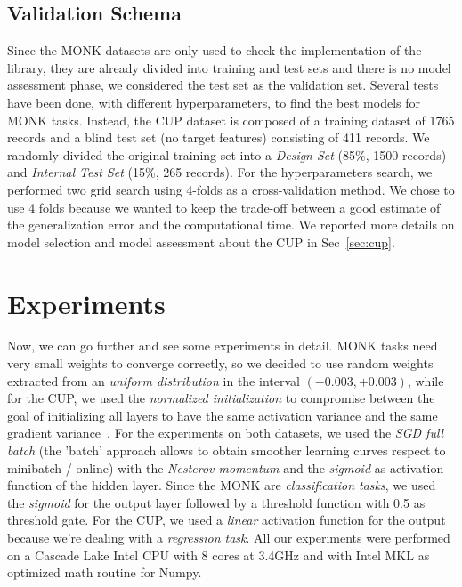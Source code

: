 \documentclass[11pt]{article}
\begin{document}
\subsection{Validation Schema}
\label{sec:validation_schema}
Since the MONK datasets are only used to check the implementation of the library, they are already divided into training and test sets and there is no model assessment phase, we considered the test set as the validation set. Several tests have been done, with different hyperparameters, to find the best models for MONK tasks. Instead, the CUP dataset is composed of a training dataset of 1765 records and a blind test set (no target features) consisting of 411 records. We randomly divided the original training set into a \textit{Design Set} (85\%, 1500 records) and \textit{Internal Test Set} (15\%, 265 records). For the hyperparameters search, we performed two grid search using 4-folds as a cross-validation method. We chose to use 4 folds because we wanted to keep the trade-off between a good estimate of the generalization error and the computational time. We reported more details on model selection and model assessment about the CUP in Sec~\ref{sec:cup}. 

\section{Experiments}
\label{sec:experiment}
Now, we can go further and see some experiments in detail. MONK tasks need very small weights to converge correctly, so we decided to use random weights extracted from an \textit{uniform distribution} in the interval $(-0.003,+0.003)$, while for the CUP, we used the \textit{normalized initialization} to compromise between the goal of initializing all layers to have the same activation variance and the same gradient variance~\cite{Glorot10understandingthe}. For the experiments on both datasets, we used the \emph{SGD full batch} (the ’batch’ approach allows to obtain smoother learning curves respect to minibatch / online) with the \emph{Nesterov momentum} and the \emph{sigmoid} as activation function of the hidden layer. Since the MONK are \emph{classification tasks}, we used the \emph{sigmoid} for the output layer followed by a threshold function with 0.5 as threshold gate. For the CUP, we used a \emph{linear} activation function for the output because we're dealing with a \emph{regression task}.
All our experiments were performed on a Cascade Lake Intel CPU with 8 cores at 3.4GHz and with Intel MKL as optimized math routine for Numpy.
\end{document}
